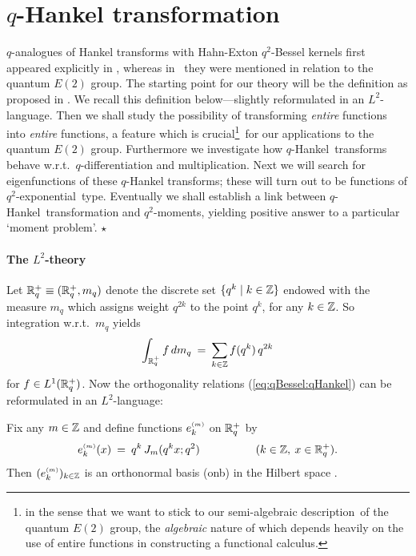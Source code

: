 \section{$q$-Hankel transformation}  \label{sec:qHankel}
\begin{abs} \rm
$q$-analogues of Hankel transforms with Hahn-Exton $q^2$-Bessel
kernels first appeared explicitly in \cite{KoornwSwartt}, whereas
in \cite{Vainerman}\ they were mentioned in relation to
the quantum $E(2)$ group. The starting point for our theory will
be the definition as proposed in \cite{KoornwSwartt}\@.
We recall this definition below---slightly reformulated in
an $L^2$-language. Then we shall study the possibility of
transforming {\em entire\/} functions into {\em entire\/}
functions, a feature which is
crucial\footnote{in the sense that we want to stick to our semi-algebraic
description\cite{Jeroen:QE2:haar}\ of the quantum $E(2)$ group,
the {\em algebraic\/} nature of which depends heavily on the use of entire functions
in constructing a functional calculus.}\ for our applications to the
quantum $E(2)$ group.
Furthermore we investigate how \mbox{$q$-Hankel}\ transforms behave
w.r.t.\ $q$-differentiation and multiplication. Next we
will search for eigenfunctions of these $q$-Hankel transforms;
these will turn out to be functions of \mbox{$q^2$-exponential}\ type.
Eventually we shall establish a link between \mbox{$q$-Hankel}\ transformation and
\mbox{$q^2$-moments}, yielding positive answer to a particular \lq moment problem\rq.
\hfill $\star$
\end{abs}

\paragraph{The $L^2$-theory}
Let $\RR_q^+ \equiv (\RR_q^+,m_q)$ denote the discrete set $\{ q^k \mid k\in\ZZ \}$
endowed with the measure $m_q$ which assigns weight $q^{2k}$ to the
point $q^k$, for any $k\in\ZZ$. So integration w.r.t.\ $m_q$ yields
$$ \int_{\RR_q^+} f\,dm_q \:=\: \sum_{k\in \ZZ} f(q^k)\,q^{2k} $$
for $f\in L^1(\RR_q^+)$. Now the orthogonality relations (\ref{eq:qBessel:qHankel})
can be reformulated in an $L^2$-language:

\begin{prop}
Fix any $m\in\ZZ$ and define functions $\basis{m}{k}$ on $\RR_q^+$ by
$$  \basis{m}{k}(x) \: =\: q^k \,\J{m}{q^k x} \hspace{5em} (k\in \ZZ,\: x\in\RR_q^+). $$
Then $(\basis{m}{k})_{k\in \ZZ}$ is an orthonormal basis ({\sc onb}) in
the Hilbert space \Ltwoq\@.
\end{prop}

